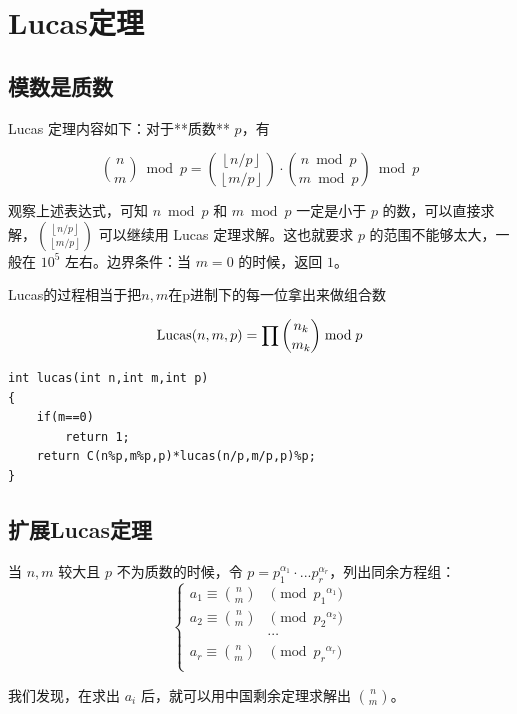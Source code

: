 \section{Lucas定理}
\subsection{模数是质数}
\par \noindent Lucas 定理内容如下：对于**质数** $p$，有

$$
\binom{n}{m}\bmod p = \binom{\left\lfloor n/p \right\rfloor}{\left\lfloor m/p\right\rfloor}\cdot\binom{n\bmod p}{m\bmod p}\bmod p
$$

\par \noindent 观察上述表达式，可知 $n\bmod p$ 和 $m\bmod p$ 一定是小于 $p$ 的数，可以直接求解，$\displaystyle\binom{\left\lfloor n/p \right\rfloor}{\left\lfloor m/p\right\rfloor}$ 可以继续用 Lucas 定理求解。这也就要求 $p$ 的范围不能够太大，一般在 $10^5$ 左右。边界条件：当 $m=0$ 的时候，返回 $1$。

\par \noindent Lucas的过程相当于把$n,m$在p进制下的每一位拿出来做组合数

$$
\text{Lucas}(n,m,p)=\prod \dbinom {n_k}{m_k} \bmod p
$$

\begin{verbatim}
int lucas(int n,int m,int p)
{
    if(m==0)
        return 1;
    return C(n%p,m%p,p)*lucas(n/p,m/p,p)%p;
}
\end{verbatim}

\subsection{扩展Lucas定理}
\par \noindent 当 $n, m$ 较大且 $p$ 不为质数的时候，令 $p = p_1^{\alpha_1} \cdot ... p_r^{\alpha_r}$，列出同余方程组：
$$
\begin{cases}
a_1\equiv \displaystyle\binom{n}{m}&\pmod {{p_1}^{\alpha_1}}\\
a_2\equiv \displaystyle\binom{n}{m}&\pmod {{p_2}^{\alpha_2}}\\
&\cdots\\
a_r\equiv \displaystyle\binom{n}{m}&\pmod {{p_r}^{\alpha_r}}\\
\end{cases}
$$
\par \noindent 我们发现，在求出 $a_i$ 后，就可以用中国剩余定理求解出 $\binom{n}{m}$。

